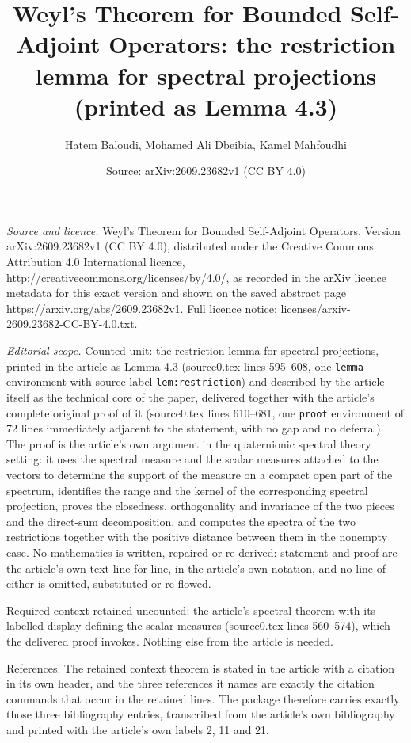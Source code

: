 \documentclass[10pt,a4paper]{amsart}
\title[Weyl's Theorem for Bounded Self-Adjoint Operators]{Weyl's Theorem for Bounded Self-Adjoint Operators: the restriction lemma for spectral projections (printed as Lemma 4.3)}
\author{Hatem Baloudi, Mohamed Ali Dbeibia, Kamel Mahfoudhi}
\date{Source: arXiv:2609.23682v1 (CC BY 4.0)}
\theoremstyle{plain}
\theoremstyle{definition}
\theoremstyle{remark}
\begin{document}
\maketitle

\noindent\emph{Source and licence.} Weyl's Theorem for Bounded Self-Adjoint Operators. Version arXiv:2609.23682v1 (CC BY 4.0), distributed under the Creative Commons Attribution 4.0 International licence, http://creativecommons.org/licenses/by/4.0/, as recorded in the arXiv licence metadata for this exact version and shown on the saved abstract page https://arxiv.org/abs/2609.23682v1. Full licence notice: licenses/arxiv-2609.23682-CC-BY-4.0.txt.\par\smallskip

\noindent\textit{Editorial scope.} Counted unit: the restriction lemma for spectral projections, printed in the article as Lemma 4.3 (source0.tex lines 595--608, one \texttt{lemma} environment with source label \texttt{lem:restriction}) and described by the article itself as the technical core of the paper, delivered together with the article's complete original proof of it (source0.tex lines 610--681, one \texttt{proof} environment of 72 lines immediately adjacent to the statement, with no gap and no deferral). The proof is the article's own argument in the quaternionic spectral theory setting: it uses the spectral measure and the scalar measures attached to the vectors to determine the support of the measure on a compact open part of the spectrum, identifies the range and the kernel of the corresponding spectral projection, proves the closedness, orthogonality and invariance of the two pieces and the direct-sum decomposition, and computes the spectra of the two restrictions together with the positive distance between them in the nonempty case. No mathematics is written, repaired or re-derived: statement and proof are the article's own text line for line, in the article's own notation, and no line of either is omitted, substituted or re-flowed.

Required context retained uncounted: the article's spectral theorem with its labelled display defining the scalar measures (source0.tex lines 560--574), which the delivered proof invokes. Nothing else from the article is needed.

References. The retained context theorem is stated in the article with a citation in its own header, and the three references it names are exactly the citation commands that occur in the retained lines. The package therefore carries exactly those three bibliography entries, transcribed from the article's own bibliography and printed with the article's own labels 2, 11 and 21.
\end{document}
